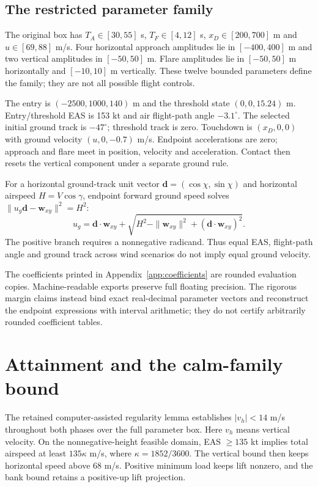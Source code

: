 \subsection*{The restricted parameter family}
The original box has $T_A\in[30,55]$ s, $T_F\in[4,12]$ s, $x_D\in[200,700]$ m and $u\in[69,88]$ m/s. Four horizontal approach amplitudes lie in $[-400,400]$ m and two vertical amplitudes in $[-50,50]$ m. Flare amplitudes lie in $[-50,50]$ m horizontally and $[-10,10]$ m vertically. These twelve bounded parameters define the family; they are not all possible flight controls.

The entry is $(-2500,1000,140)$ m and the threshold state $(0,0,15.24)$ m. Entry/threshold EAS is 153 kt and air flight-path angle $-3.1^\circ$. The selected initial ground track is $-47^\circ$; threshold track is zero. Touchdown is $(x_D,0,0)$ with ground velocity $(u,0,-0.7)$ m/s. Endpoint accelerations are zero; approach and flare meet in position, velocity and acceleration. Contact then resets the vertical component under a separate ground rule.

For a horizontal ground-track unit vector $\mathbf d=(\cos\chi,\sin\chi)$ and horizontal airspeed $H=V\cos\gamma$, endpoint forward ground speed solves $\|u_g\mathbf d-\mathbf w_{xy}\|^2=H^2$:
\[
u_g=\mathbf d\cdot\mathbf w_{xy}+\sqrt{H^2-\|\mathbf w_{xy}\|^2+(\mathbf d\cdot\mathbf w_{xy})^2}.
\]
The positive branch requires a nonnegative radicand. Thus equal EAS, flight-path angle and ground track across wind scenarios do not imply equal ground velocity.

The coefficients printed in Appendix~\ref{app:coefficients} are rounded evaluation copies. Machine-readable exports preserve full floating precision. The rigorous margin claims instead bind exact real-decimal parameter vectors and reconstruct the endpoint expressions with interval arithmetic; they do not certify arbitrarily rounded coefficient tables.
\par\medskip
\section{Attainment and the calm-family bound}\label{app:bounds}
The retained computer-assisted regularity lemma establishes $|v_h|<14$ m/s throughout both phases over the full parameter box. Here $v_h$ means vertical velocity. On the nonnegative-height feasible domain, EAS $\geq135$ kt implies total airspeed at least $135\kappa$ m/s, where $\kappa=1852/3600$. The vertical bound then keeps horizontal speed above 68 m/s. Positive minimum load keeps lift nonzero, and the bank bound retains a positive-up lift projection.

